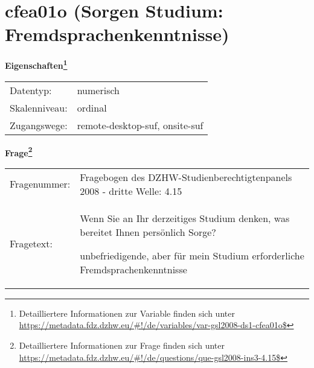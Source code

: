
    \setcounter{footnote}{0}

    \vspace*{-1.8cm}
	\section{cfea01o (Sorgen Studium: Fremdsprachenkenntnisse)}
	\label{section:cfea01o}



    \vspace*{0.5cm}
    \noindent\textbf{Eigenschaften\footnote{Detailliertere Informationen zur Variable finden sich unter
		\url{https://metadata.fdz.dzhw.eu/\#!/de/variables/var-gsl2008-ds1-cfea01o$}}}\\
	\begin{tabularx}{\hsize}{@{}lX}
	Datentyp: & numerisch \\
	Skalenniveau: & ordinal \\
	Zugangswege: &
	  remote-desktop-suf, 
	  onsite-suf
 \\
    \end{tabularx}



				\vspace*{0.5cm}
                \noindent\textbf{Frage\footnote{Detailliertere Informationen zur Frage finden sich unter
		              \url{https://metadata.fdz.dzhw.eu/\#!/de/questions/que-gsl2008-ins3-4.15$}}}\\
				\begin{tabularx}{\hsize}{@{}lX}
					Fragenummer: &
					  Fragebogen des DZHW-Studienberechtigtenpanels 2008 - dritte Welle:
					  4.15
 \\
					Fragetext: & Wenn Sie an Ihr derzeitiges Studium denken, was bereitet Ihnen persönlich Sorge?\par  unbefriedigende, aber für mein Studium erforderliche Fremdsprachenkenntnisse \\
				\end{tabularx}





